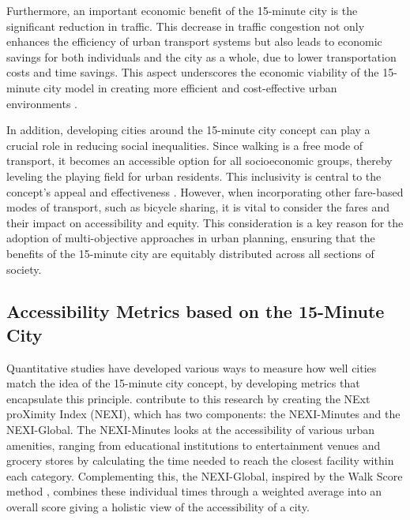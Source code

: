 Furthermore, an important economic benefit of the 15-minute city is the significant reduction in traffic. 
This decrease in traffic congestion not only enhances the efficiency of urban transport systems but also leads to economic savings for both individuals and the city as a whole, due to lower transportation costs and time savings.
This aspect underscores the economic viability of the 15-minute city model in creating more efficient and cost-effective urban environments .

In addition, developing cities around the 15-minute city concept can play a crucial role in reducing social inequalities. 
Since walking is a free mode of transport, it becomes an accessible option for all socioeconomic groups, thereby leveling the playing field for urban residents. 
This inclusivity is central to the concept's appeal and effectiveness \cite{weng15minuteWalkableNeighborhoods2019b} \cite{gustafsonExaminingSpatialChange2022}.
However, when incorporating other fare-based modes of transport, such as bicycle sharing, it is vital to consider the fares and their impact on accessibility and equity. 
This consideration is a key reason for the adoption of multi-objective approaches in urban planning, ensuring that the benefits of the 15-minute city are equitably distributed across all sections of society.


\subsection{Accessibility Metrics based on the 15-Minute City}
\label{subsec:accessibility_metrics_based_on_the_15_minute_city}

Quantitative studies have developed various ways to measure how well cities match the idea of the 15-minute city concept,  by developing metrics that encapsulate this principle.  
\cite{olivariAreItalianCities2023} contribute to this research by creating the NExt proXimity Index (NEXI), which has two components: the NEXI-Minutes and the NEXI-Global. 
The NEXI-Minutes looks at the accessibility of various urban amenities, ranging from educational institutions to entertainment venues and grocery stores by calculating the time needed to reach the closest facility within each category.
Complementing this, the NEXI-Global, inspired by the Walk Score method \cite{WalkScoreMethodology}, combines these individual times through a weighted average into an overall score giving a holistic view of the accessibility of a city.


